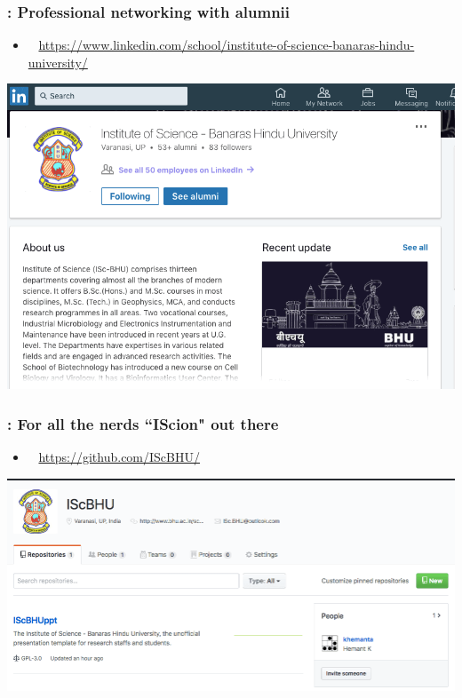 \documentclass[]{beamer} %
\begin{document}
\begin{frame}%
 \frametitle{\faLinkedinSquare: Professional networking with alumnii}
 	\begin{itemize}
	\item<+-> \faLinkedin ~ \url{https://www.linkedin.com/school/institute-of-science-banaras-hindu-university/} \\	
	\end{itemize}
	\visible<+->
	 	{%
	 	\centering
	 	\includegraphics[width=.75\textwidth]{Resources/Linkedin.png} \\ %
	 	}
\end{frame}

\begin{frame}%
 \frametitle{\faGithubSquare: For all the nerds ``IScion" out there}
 	\begin{itemize}	
	\item<+-> \faGithub ~ \url{https://github.com/IScBHU/} 
	\end{itemize}
	\visible<+->	
		{%
		\centering
		\includegraphics[width=.75\textwidth]{Resources/Git.png} \\ %
		}
\end{frame}
\end{document}
